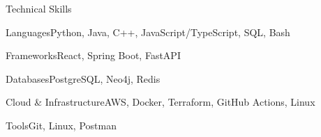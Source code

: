 \documentclass[
	11pt
]{../../../template}
\begin{document}
	\begin{rSection}{T}{echnical Skills}
		\begin{rSet}{Languages}{Python, Java, C++, JavaScript/TypeScript, SQL, Bash}
		\end{rSet}
		\begin{rSet}{Frameworks}{React, Spring Boot, FastAPI}
		\end{rSet}
		\begin{rSet}{Databases}{PostgreSQL, Neo4j, Redis}
		\end{rSet}
		\begin{rSet}{Cloud \& Infrastructure}{AWS, Docker, Terraform, GitHub Actions, Linux}
		\end{rSet}
		\begin{rSet}{Tools}{Git, Linux, Postman}
		\end{rSet}
	\end{rSection}
\end{document}
